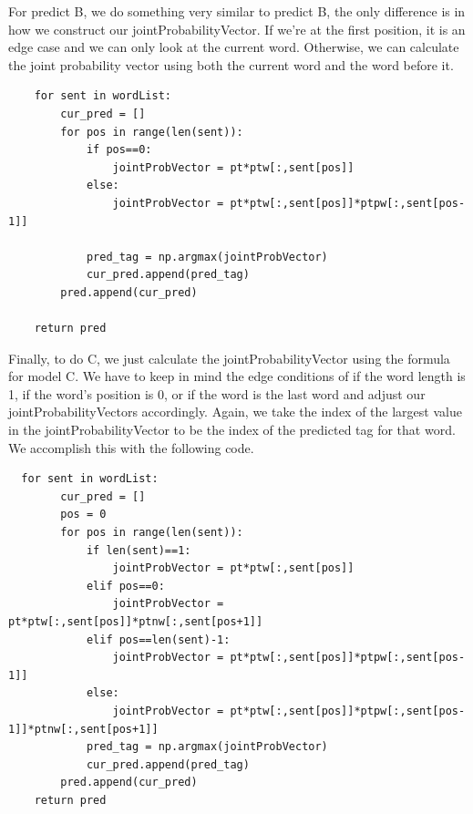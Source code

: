 \documentclass{article}
\begin{document}
For predict B, we do something very similar to predict B, the only difference is in how we construct our jointProbabilityVector.  If we're at the first position, it is an edge case and we can only look at the current word.  Otherwise, we can calculate the joint probability vector using both the current word and the word before it. 
\begin{verbatim}
	for sent in wordList:
		cur_pred = []
		for pos in range(len(sent)):
            if pos==0:
                jointProbVector = pt*ptw[:,sent[pos]]
            else:
                jointProbVector = pt*ptw[:,sent[pos]]*ptpw[:,sent[pos-1]]
                        
            pred_tag = np.argmax(jointProbVector)
			cur_pred.append(pred_tag)
		pred.append(cur_pred)

	return pred \end{verbatim}
Finally, to do C, we just calculate the jointProbabilityVector using the formula for model C.  We have to keep in mind the edge conditions of if the word length is 1, if the word's position is 0, or if the word is the last word and adjust our jointProbabilityVectors accordingly.  Again, we take the index of the largest value in the jointProbabilityVector to be the index of the predicted tag for that word.  We accomplish this with the following code. \begin{verbatim}	for sent in wordList:
		cur_pred = []
		pos = 0
		for pos in range(len(sent)):
            if len(sent)==1:
                jointProbVector = pt*ptw[:,sent[pos]]
            elif pos==0:
                jointProbVector = pt*ptw[:,sent[pos]]*ptnw[:,sent[pos+1]]
            elif pos==len(sent)-1:
                jointProbVector = pt*ptw[:,sent[pos]]*ptpw[:,sent[pos-1]]
            else:
                jointProbVector = pt*ptw[:,sent[pos]]*ptpw[:,sent[pos-1]]*ptnw[:,sent[pos+1]]
			pred_tag = np.argmax(jointProbVector)
            cur_pred.append(pred_tag)
		pred.append(cur_pred)
	return pred \end{verbatim}
\end{document}
